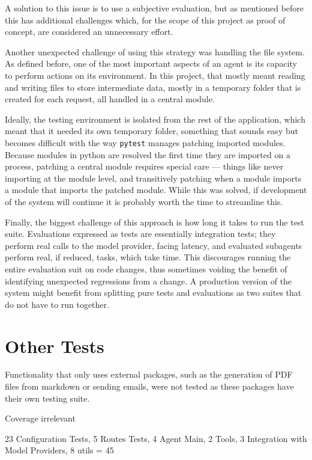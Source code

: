\documentclass[a4paper]{report}
\begin{document}
A solution to this issue is to use a subjective evaluation, but as mentioned before this has additional challenges which, for the scope of this project as proof of concept, are considered an unnecessary effort.

Another unexpected challenge of using this strategy was handling the file system. As defined before, one of the most important aspects of an agent is its capacity to perform actions on its environment. In this project, that mostly meant reading and writing files to store intermediate data, mostly in a temporary folder that is created for each request, all handled in a central module.

Ideally, the testing environment is isolated from the rest of the application, which meant that it needed its own temporary folder, something that sounds easy but becomes difficult with the way \texttt{pytest} manages patching imported modules. Because modules in python are resolved the first time they are imported on a process, patching a central module requires special care --- things like never importing at the module level, and transitively patching when a module imports a module that imports the patched module. While this was solved, if development of the system will continue it is probably worth the time to streamline this.

Finally, the biggest challenge of this approach is how long it takes to run the test suite. Evaluations expressed as tests are essentially integration tests; they perform real calls to the model provider, facing latency, and evaluated subagents perform real, if reduced, tasks, which take time. This discourages running the entire evaluation suit on code changes, thus sometimes voiding the benefit of identifying unexpected regressions from a change. A production version of the system might benefit from splitting pure tests and evaluations as two suites that do not have to run together.

\section{Other Tests}
\label{sec:other-tests}

Functionality that only uses external packages, such as the generation of PDF files from markdown or sending emails, were not tested as these packages have their own testing suite.

Coverage irrelevant

23 Configuration Tests, 5 Routes Tests, 4 Agent Main, 2 Tools, 3 Integration with Model Providers, 8 utils = 45
\end{document}
